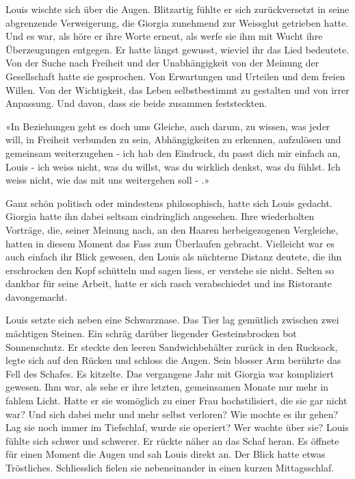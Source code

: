 Louis wischte sich über die Augen. Blitzartig fühlte er sich 
zurückversetzt in seine abgrenzende Verweigerung, die Giorgia zunehmend 
zur Weissglut getrieben hatte. Und es war, als höre er ihre Worte
erneut, als werfe sie ihm mit Wucht ihre Überzeugungen entgegen. Er hatte längst gewusst, wieviel ihr das Lied bedeutete.
Von der Suche nach Freiheit und der Unabhängigkeit von der Meinung
der Gesellschaft hatte sie gesprochen. Von Erwartungen und Urteilen und dem freien
Willen. Von der Wichtigkeit, das Leben selbstbestimmt zu gestalten und
von irrer Anpassung. Und davon, dass sie beide zusammen feststeckten. 

«In Beziehungen geht es doch ums Gleiche, auch darum, zu wissen, was
jeder will, in Freiheit verbunden zu sein, Abhängigkeiten zu erkennen,
aufzulösen und gemeinsam weiterzugehen - ich hab den
Eindruck, du passt dich mir einfach an, Louis - ich weiss nicht, was du willst,
was du wirklich denkst, was du fühlst. Ich weiss nicht, wie das mit uns weitergehen soll - .»

Ganz schön politisch oder mindestens philosophisch, hatte sich Louis
gedacht. Giorgia hatte ihn dabei seltsam eindringlich angesehen. Ihre wiederholten Vorträge, 
die, seiner Meinung nach, an den Haaren herbeigezogenen Vergleiche, hatten in diesem Moment 
das Fass zum Überlaufen gebracht. Vielleicht war es auch einfach ihr Blick gewesen, 
den Louis als nüchterne Distanz deutete, die ihn erschrocken den Kopf schütteln und sagen liess, er verstehe sie nicht. Selten so dankbar für seine Arbeit, hatte er sich rasch verabschiedet und ins Ristorante davongemacht. 


Louis setzte sich neben eine Schwarznase. Das Tier lag gemütlich
zwischen zwei mächtigen Steinen. Ein schräg darüber liegender
Gesteinsbrocken bot Sonnenschutz. Er steckte den leeren Sandwichbehälter zurück in den Rucksack,  legte sich auf den Rücken und schloss die Augen. Sein blosser Arm berührte das Fell des Schafes. Es kitzelte. 
Das vergangene Jahr mit Giorgia war kompliziert gewesen. Ihm war, als
sehe er ihre letzten, gemeinsamen Monate nur mehr in fahlem Licht. Hatte er sie womöglich zu einer Frau hochstilisiert, die sie gar nicht war? Und sich dabei mehr und mehr selbst verloren? Wie mochte es ihr gehen? Lag sie noch immer im Tiefschlaf, wurde sie  operiert? Wer wachte über sie?
Louis fühlte sich schwer und schwerer. Er rückte näher an das Schaf heran. Es öffnete für einen Moment die Augen und sah Louis direkt an. Der
Blick hatte etwas Tröstliches. Schliesslich fielen sie nebeneinander in einen kurzen Mittagsschlaf.
